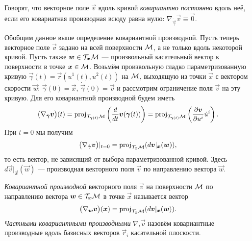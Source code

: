 \begin{definition}
	Говорят, что векторное поле $\vec{v}$ вдоль кривой \textit{ковариантно постоянно} вдоль неё, если его ковариатная производная всюду равна нулю: $\nabla_{\dot{\vec{\gamma}}}\vec{v} \equiv \vec{0}$.
\end{definition}


Обобщим данное выше определение ковариантной производной. Пусть теперь векторное поле $\vec{v}$ задано на всей поверхности $\mathcal{M}$, а не только вдоль некоторой кривой. Пусть также $\boldsymbol{w} \in \mathcal{T}_{\boldsymbol{x}}\mathcal{M}$ --- произвольный касательный вектор к поверхности в точке $\boldsymbol{x} \in \mathcal{M}$. Возьмём произвольную гладко параметризованную кривую $\vec{\gamma}(t) = \vec{r}(u^1(t), u^2(t))$ на $\mathcal{M}$, выходящую из точки $\vec{x}$ с вектором скорости $\vec{w}$: $\vec{\gamma}(0) = \vec{x}$, $\dot{\vec{\gamma}}(0) = \vec{v}$ и рассмотрим ограничение поля $\vec{v}$ на эту кривую. Для его ковариантной производной будем иметь
\[
	\big(\nabla_{\dot{\boldsymbol{\gamma}}}\boldsymbol{v}\big)(t) = \operatorname{proj}_{\mathcal{T}_{\boldsymbol{\gamma}(t)}\mathcal{M}}\left(\frac{d}{dt}\boldsymbol{v}(\boldsymbol{\gamma}(t))\right) = \operatorname{proj}_{\mathcal{T}_{\boldsymbol{\gamma}(t)}\mathcal{M}}\left(\frac{\partial\boldsymbol{v}}{\partial u^i}\dot{u}^i\right).
\]
При $t = 0$ мы получим
\[
	\big(\nabla_{\dot{\boldsymbol{\gamma}}}\boldsymbol{v}\big)|_{t = 0} = \operatorname{proj}_{\mathcal{T}_{\boldsymbol{x}}\mathcal{M}}(d\boldsymbol{v}|_{\boldsymbol{x}}(\boldsymbol{w})),
\]
то есть вектор, не зависящий от выбора параметризованной кривой. Здесь $d\vec{v}|_{\vec{x}}(\vec{w})$ --- производная векторного поля $\vec{v}$ по направлению вектора $\vec{w}$.

\begin{definition}
	\textit{Ковариантной производной} векторного поля $\vec{v}$ на поверхности $\mathcal{M}$ по направлению вектора $\boldsymbol{w} \in \mathcal{T}_{\boldsymbol{x}}\mathcal{M}$ в точке $\vec{x}$ называется вектор
	\[
		\big(\nabla_{\boldsymbol{w}}\boldsymbol{v}\big)(\boldsymbol{x}) = \operatorname{proj}_{\mathcal{T}_{\boldsymbol{x}}\mathcal{M}}(d\boldsymbol{v}|_{\boldsymbol{x}}(\boldsymbol{w})).
	\]
	\textit{Частными ковариантными производными} $\nabla_i\vec{v}$ назовём ковариантные производные вдоль базисных векторов $\vec{r}_i$ касательной плоскости.
\end{definition}


